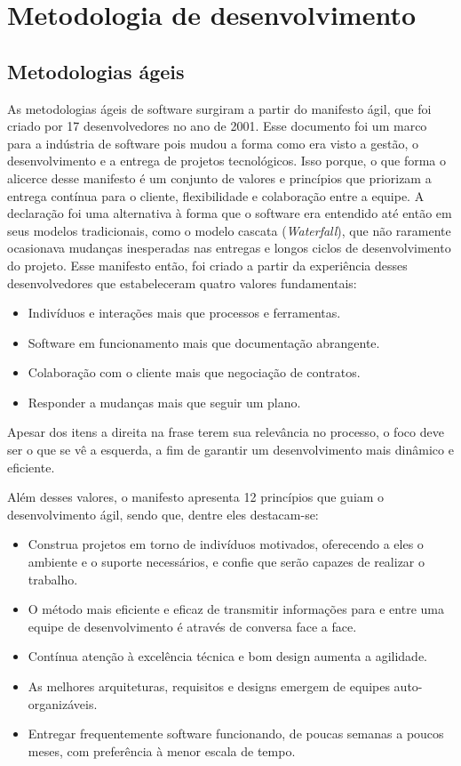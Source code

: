 \section{Metodologia de desenvolvimento}
\subsection{Metodologias ágeis}
As metodologias ágeis de software surgiram a partir do manifesto ágil, que foi criado por 17 desenvolvedores no ano de 2001. Esse documento foi um marco para a indústria de software pois mudou a forma como era visto a gestão, o desenvolvimento e a entrega de projetos tecnológicos. Isso porque, o que forma o alicerce desse manifesto é
um conjunto de valores e princípios que priorizam a entrega contínua para o cliente, flexibilidade e colaboração entre a equipe. A declaração foi uma alternativa à forma que o software era entendido até então em seus modelos tradicionais, como o modelo cascata (\textit{Waterfall}), que não raramente ocasionava mudanças inesperadas nas entregas e longos ciclos de desenvolvimento do projeto. Esse manifesto então, foi criado a partir da experiência desses desenvolvedores que estabeleceram quatro valores fundamentais: 

\begin{itemize}
    \item Indivíduos e interações mais que processos e ferramentas.
    \item Software em funcionamento mais que documentação abrangente.
    \item Colaboração com o cliente mais que negociação de contratos.
    \item Responder a mudanças mais que seguir um plano.
\end{itemize}

Apesar dos itens a direita na frase terem sua relevância no processo, o foco deve ser o que se vê a esquerda, a fim de garantir um desenvolvimento mais dinâmico e eficiente.

Além desses valores, o manifesto apresenta 12 princípios que guiam o desenvolvimento ágil, sendo que, dentre eles destacam-se:

\begin{itemize}
    \item Construa projetos em torno de indivíduos motivados, oferecendo a eles o ambiente e o suporte necessários, e confie que serão capazes de realizar o trabalho.
    \item O método mais eficiente e eficaz de transmitir informações para e entre uma equipe de desenvolvimento é através de conversa face a face.
    \item Contínua atenção à excelência técnica e bom design aumenta a agilidade.
    \item As melhores arquiteturas, requisitos e designs emergem de equipes auto-organizáveis.
    \item Entregar frequentemente software funcionando, de poucas semanas a poucos meses, com preferência à menor escala de tempo.
\end{itemize}

